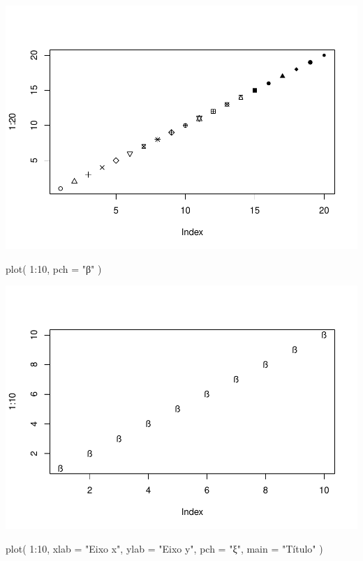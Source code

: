 \documentclass[
]{article}
\newenvironment{Shaded}{\begin{snugshade}}{\end{snugshade}}
\newcommand{\AttributeTok}[1]{\textcolor[rgb]{0.77,0.63,0.00}{#1}}
\newcommand{\DecValTok}[1]{\textcolor[rgb]{0.00,0.00,0.81}{#1}}
\newcommand{\FunctionTok}[1]{\textcolor[rgb]{0.00,0.00,0.00}{#1}}
\newcommand{\NormalTok}[1]{#1}
\newcommand{\SpecialCharTok}[1]{\textcolor[rgb]{0.00,0.00,0.00}{#1}}
\newcommand{\StringTok}[1]{\textcolor[rgb]{0.31,0.60,0.02}{#1}}
\begin{document}
\includegraphics{presencial_função_plot_04_turma_B_files/figure-latex/unnamed-chunk-12-1.pdf}

\begin{Shaded}
\begin{Highlighting}[]
\FunctionTok{plot}\NormalTok{( }\DecValTok{1}\SpecialCharTok{:}\DecValTok{10}\NormalTok{, }\AttributeTok{pch =} \StringTok{"β"}\NormalTok{ )}
\end{Highlighting}
\end{Shaded}

\includegraphics{presencial_função_plot_04_turma_B_files/figure-latex/unnamed-chunk-12-2.pdf}

\begin{Shaded}
\begin{Highlighting}[]
\FunctionTok{plot}\NormalTok{( }\DecValTok{1}\SpecialCharTok{:}\DecValTok{10}\NormalTok{, }\AttributeTok{xlab =} \StringTok{"Eixo x"}\NormalTok{, }\AttributeTok{ylab =} \StringTok{"Eixo y"}\NormalTok{, }\AttributeTok{pch =} \StringTok{"ξ"}\NormalTok{, }\AttributeTok{main =} \StringTok{"Título"}\NormalTok{ )}
\end{Highlighting}
\end{Shaded}
\end{document}
